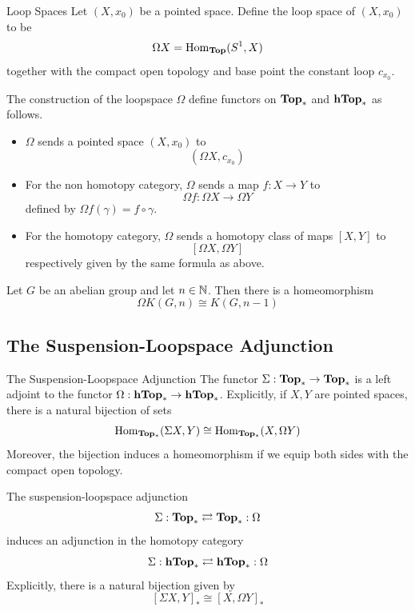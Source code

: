 \documentclass[a4paper]{article}
\begin{document}
\begin{defn}{Loop Spaces}{} Let $(X,x_0)$ be a pointed space. Define the loop space of $(X,x_0)$ to be $$\Omega X=\operatorname{Hom}_\bold{Top}(S^1,X)$$ together with the compact open topology and base point the constant loop $c_{x_0}$. 
\end{defn}

\begin{thm}{}{} The construction of the loopspace $\Omega$ define functors on $\bold{Top}_\ast$ and $\bold{hTop}_\ast$ as follows. 
\begin{itemize}
\item $\Omega$ sends a pointed space $(X,x_0)$ to $$(\Omega X,c_{x_0})$$
\item For the non homotopy category, $\Omega$ sends a map $f:X\to Y$ to $$\Omega f:\Omega X\to\Omega Y$$ defined by $\Omega f(\gamma)=f\circ\gamma$. 
\item For the homotopy category, $\Omega$ sends a homotopy class of maps $[X,Y]$ to $$[\Omega X,\Omega Y]$$ respectively given by the same formula as above. 
\end{itemize}
\end{thm}

\begin{lmm}{}{} Let $G$ be an abelian group and let $n\in\mathbb{N}$. Then there is a homeomorphism $$\Omega K(G,n)\cong K(G,n-1)$$
\end{lmm}

\subsection{The Suspension-Loopspace Adjunction}
\begin{thm}{The Suspension-Loopspace Adjunction}{} The functor $\Sigma:\bold{Top}_\ast\to\bold{Top}_\ast$ is a left adjoint to the functor $\Omega:\bold{hTop}_\ast\to\bold{hTop}_\ast$. Explicitly, if $X,Y$ are pointed spaces, there is a natural bijection of sets $$\operatorname{Hom}_\bold{Top_\ast}(\Sigma X,Y)\cong\operatorname{Hom}_\bold{Top_\ast}(X,\Omega Y)$$ Moreover, the bijection induces a homeomorphism if we equip both sides with the compact open topology. 
\end{thm}

\begin{thm}{}{} The suspension-loopspace adjunction $$\Sigma:\bold{Top}_\ast\rightleftarrows\bold{Top}_\ast:\Omega$$ induces an adjunction in the homotopy category $$\Sigma:\bold{hTop}_\ast\rightleftarrows\bold{hTop}_\ast:\Omega$$ Explicitly, there is a natural bijection given by $$[\Sigma X,Y]_\ast\cong[X,\Omega Y]_\ast$$
\end{thm}
\end{document}
